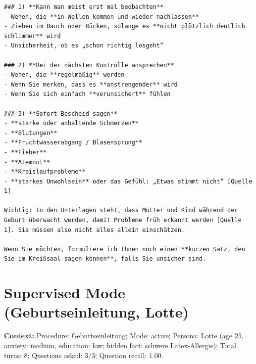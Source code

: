 \begin{Verbatim}[fontsize=\small,breaklines=true,breakanywhere=true]
### 1) **Kann man meist erst mal beobachten**
- Wehen, die **in Wellen kommen und wieder nachlassen**
- Ziehen im Bauch oder Rücken, solange es **nicht plötzlich deutlich schlimmer** wird
- Unsicherheit, ob es „schon richtig losgeht“  

### 2) **Bei der nächsten Kontrolle ansprechen**
- Wehen, die **regelmäßig** werden
- Wenn Sie merken, dass es **anstrengender** wird
- Wenn Sie sich einfach **verunsichert** fühlen

### 3) **Sofort Bescheid sagen**
- **starke oder anhaltende Schmerzen**
- **Blutungen**
- **Fruchtwasserabgang / Blasensprung**
- **Fieber**
- **Atemnot**
- **Kreislaufprobleme**
- **starkes Unwohlsein** oder das Gefühl: „Etwas stimmt nicht“ [Quelle 1]

Wichtig: In den Unterlagen steht, dass Mutter und Kind während der Geburt überwacht werden, damit Probleme früh erkannt werden [Quelle 1]. Sie müssen also nicht alles allein einschätzen.

Wenn Sie möchten, formuliere ich Ihnen noch einen **kurzen Satz, den Sie im Kreißsaal sagen können**, falls Sie unsicher sind.
\end{Verbatim}

\section{Supervised Mode (Geburtseinleitung, Lotte)}
\textbf{Context:} Procedure: Geburtseinleitung; Mode: active; Persona: Lotte (age 25, anxiety: medium, education: low; hidden fact: schwere Latex-Allergie); Total turns: 8; Questions asked: 3/3; Question recall: 1.00.

